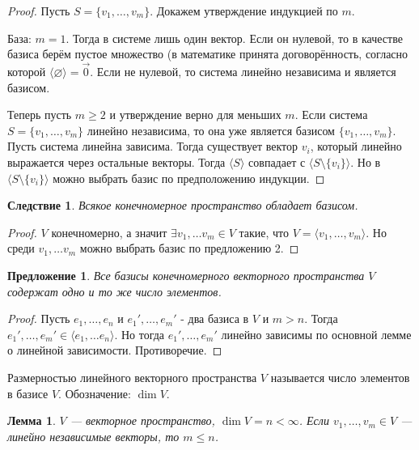 \documentclass[a4paper, 12pt]{article}
\newtheorem*{lemma}{Лемма}
\newtheorem{base_44}{Предложение}
\newtheorem*{base_44-cons}{Следствие}
\begin{document}
\begin{proof}
Пусть $S = \{v_1, \dots, v_m\}$. Докажем утверждение индукцией по $m$.

База: $m=1$. Тогда в системе лишь один вектор. Если он нулевой, то в качестве базиса берём пустое множество (в математике принята договорённость, согласно которой $\langle \varnothing \rangle = \vec{0}$. Если не нулевой, то система линейно независима и является базисом.

Теперь пусть $m \geqslant 2$ и утверждение верно для меньших $m$. Если система $S = \{v_1, \dots, v_m\}$ линейно независима, то она уже является базисом $\{v_1, \dots, v_m\}$. Пусть система линейна зависима. Тогда существует вектор $v_i$, который линейно выражается через остальные векторы. Тогда $\langle S \rangle$ совпадает с $\langle S\setminus \{v_i\}\rangle$. Но в $\langle S\setminus \{v_i\}\rangle$ можно выбрать базис по предположению индукции.
\end{proof}

\begin{base_44-cons}
Всякое конечномерное пространство обладает базисом.
\end{base_44-cons}

\begin{proof}
$V$ конечномерно, а значит $\exists v_1, \dots v_m \in V$ такие, что $V = \langle v_1, \dots, v_m\rangle$. Но среди $v_1, \dots v_m$ можно выбрать базис по предложению 2.
\end{proof}

\begin{base_44}
Все базисы конечномерного векторного пространства $V$ содержат одно и то же число элементов. 
\end{base_44}

\begin{proof}
Пусть $e_1, \dots, e_n$ и $e_1', \dots, e_m'$ - два базиса в $V$ и $m>n$. Тогда $e_1', \dots, e_m' \in \langle e_1, \dots e_n\rangle$. Но тогда $e_1', \dots, e_m'$ линейно зависимы по основной лемме о линейной зависимости. Противоречие.
\end{proof}

Размерностью линейного векторного пространства $V$ называется число элементов в базисе $V$. Обозначение: $\dim V$. 

\begin{lemma}
$V$ — векторное пространство, $\dim V = n < \infty$. Если $v_1, \dots, v_m \in V$ — линейно независимые векторы, то $m \leqslant n$.
\end{lemma}
\end{document}
